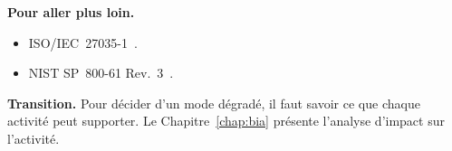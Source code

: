 \bigskip

\begin{boxinfo}
\textbf{Pour aller plus loin.}
\begin{itemize}
    \item ISO/IEC~27035-1~\cite{iso27035_2023}.
    \item NIST SP~800-61 Rev.~3~\cite{nist80061r3}.
\end{itemize}
\end{boxinfo}

\begin{boxinfo}
\textbf{Transition.} Pour décider d'un mode dégradé, il faut savoir ce que
chaque activité peut supporter. Le Chapitre~\ref{chap:bia} présente
l'analyse d'impact sur l'activité.
\end{boxinfo}
